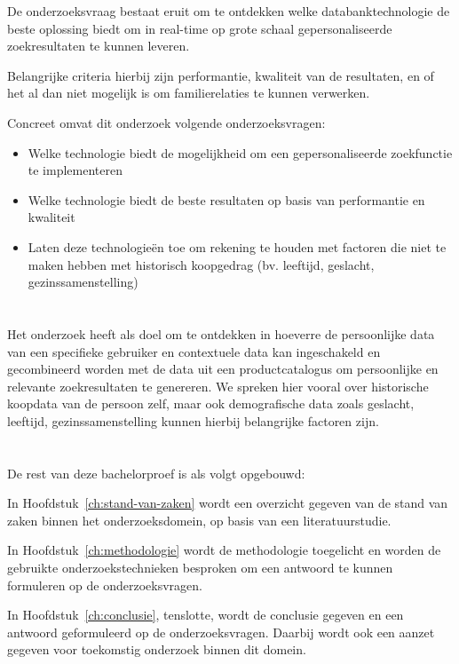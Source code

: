 De onderzoeksvraag bestaat eruit om te ontdekken welke databanktechnologie de beste oplossing biedt om in real-time op grote schaal gepersonaliseerde zoekresultaten te kunnen leveren.

Belangrijke criteria hierbij zijn performantie, kwaliteit van de resultaten, en of het al dan niet mogelijk is om familierelaties te kunnen verwerken. 

Concreet omvat dit onderzoek volgende onderzoeksvragen:
\begin{itemize}
	\item Welke technologie biedt de mogelijkheid om een gepersonaliseerde zoekfunctie te implementeren
	\item Welke technologie biedt de beste resultaten op basis van performantie en kwaliteit
	\item Laten deze technologieën toe om rekening te houden met factoren die niet te maken hebben met historisch koopgedrag (bv. leeftijd, geslacht, gezinssamenstelling)

\end{itemize} 

\section{}
\label{sec:onderzoeksdoelstelling}

Het onderzoek heeft als doel om te ontdekken in hoeverre de persoonlijke data van een specifieke gebruiker en contextuele data kan ingeschakeld en gecombineerd worden met de data uit een productcatalogus om persoonlijke en relevante zoekresultaten te genereren.
We spreken hier vooral over historische koopdata van de persoon zelf, maar ook demografische data zoals geslacht, leeftijd, gezinssamenstelling kunnen hierbij belangrijke factoren zijn. 

\section{}
\label{sec:opzet-bachelorproef}


De rest van deze bachelorproef is als volgt opgebouwd:

In Hoofdstuk~\ref{ch:stand-van-zaken} wordt een overzicht gegeven van de stand van zaken binnen het onderzoeksdomein, op basis van een literatuurstudie.

In Hoofdstuk~\ref{ch:methodologie} wordt de methodologie toegelicht en worden de gebruikte onderzoekstechnieken besproken om een antwoord te kunnen formuleren op de onderzoeksvragen.


In Hoofdstuk~\ref{ch:conclusie}, tenslotte, wordt de conclusie gegeven en een antwoord geformuleerd op de onderzoeksvragen. Daarbij wordt ook een aanzet gegeven voor toekomstig onderzoek binnen dit domein.